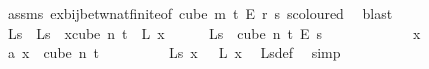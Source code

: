 \begin{isabellebody}
\ assms{\isacharparenleft}{\kern0pt}{}{\isacharparenright}{\kern0pt}\ ex{\isacharunderscore}{\kern0pt}bij{\isacharunderscore}{\kern0pt}betw{\isacharunderscore}{\kern0pt}nat{\isacharunderscore}{\kern0pt}finite{\isacharunderscore}{\kern0pt}{}{\isacharbrackleft}{\kern0pt}of\ {\isachardoublequoteopen}cube\ m\ {\isacharparenleft}{\kern0pt}t{\isacharplus}{\kern0pt}{}{\isacharparenright}{\kern0pt}\ {\isasymrightarrow}\isactrlsub E\ {\isacharbraceleft}{\kern0pt}{\isachardot}{\kern0pt}{\isachardot}{\kern0pt}{\isacharless}{\kern0pt}r{\isacharbraceright}{\kern0pt}{\isachardoublequoteclose}\ {\isachardoublequoteopen}s{\isachardoublequoteclose}{\isacharbrackright}{\kern0pt}\ s{\isacharunderscore}{\kern0pt}coloured\ \isamarkupfalse%
\ blast\isanewline
\ \ \ \ \isamarkupfalse%
\ {\isasymchi}L{\isacharunderscore}{\kern0pt}s\ \ {\isachardoublequoteopen}{\isasymchi}L{\isacharunderscore}{\kern0pt}s\ {\isasymequiv}\ {\isacharparenleft}{\kern0pt}{\isasymlambda}x{\isasymin}cube\ n\ {\isacharparenleft}{\kern0pt}t{\isacharplus}{\kern0pt}{}{\isacharparenright}{\kern0pt}{\isachardot}{\kern0pt}\ {\isasymphi}\ {\isacharparenleft}{\kern0pt}{\isasymchi}L\ x{\isacharparenright}{\kern0pt}{\isacharparenright}{\kern0pt}{\isachardoublequoteclose}\isanewline
\ \ \ \ \isamarkupfalse%
\ {\isachardoublequoteopen}{\isasymchi}L{\isacharunderscore}{\kern0pt}s\ {\isasymin}\ cube\ n\ {\isacharparenleft}{\kern0pt}t{\isacharplus}{\kern0pt}{}{\isacharparenright}{\kern0pt}\ {\isasymrightarrow}\isactrlsub E\ {\isacharbraceleft}{\kern0pt}{\isachardot}{\kern0pt}{\isachardot}{\kern0pt}{\isacharless}{\kern0pt}s{\isacharbraceright}{\kern0pt}{\isachardoublequoteclose}\isanewline
\ \ \ \ \isamarkupfalse%
\isanewline
\ \ \ \ \ \ \isamarkupfalse%
\ x\ \isamarkupfalse%
\ a{\isacharcolon}{\kern0pt}\ {\isachardoublequoteopen}x\ {\isasymin}\ cube\ n\ {\isacharparenleft}{\kern0pt}t{\isacharplus}{\kern0pt}{}{\isacharparenright}{\kern0pt}{\isachardoublequoteclose}\isanewline
\ \ \ \ \ \ \isamarkupfalse%
\ \isamarkupfalse%
\ {\isachardoublequoteopen}{\isasymchi}L{\isacharunderscore}{\kern0pt}s\ x\ {\isacharequal}{\kern0pt}\ {\isasymphi}\ {\isacharparenleft}{\kern0pt}{\isasymchi}L\ x{\isacharparenright}{\kern0pt}{\isachardoublequoteclose}\ \isamarkupfalse%
\ {\isasymchi}L{\isacharunderscore}{\kern0pt}s{\isacharunderscore}{\kern0pt}def\ \isamarkupfalse%
\ simp\isanewline

\end{isabellebody}
